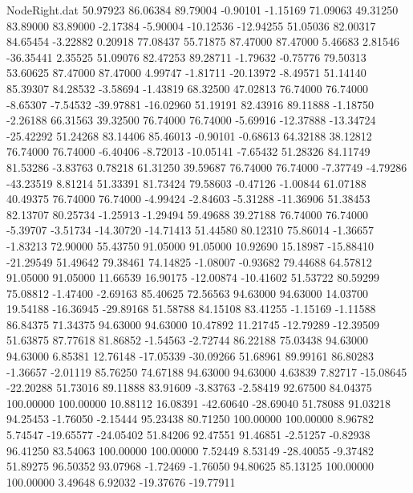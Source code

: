 \begin{filecontents}{NodeRight.dat}
  50.97923   86.06384   89.79004    -0.90101   -1.15169   71.09063   49.31250   83.89000   83.89000   -2.17384   -5.90004  -10.12536  -12.94255
  51.05036   82.00317   84.65454    -3.22882    0.20918   77.08437   55.71875   87.47000   87.47000    5.46683    2.81546  -36.35441    2.35525
  51.09076   82.47253   89.28711    -1.79632   -0.75776   79.50313   53.60625   87.47000   87.47000    4.99747   -1.81711  -20.13972   -8.49571
  51.14140   85.39307   84.28532    -3.58694   -1.43819   68.32500   47.02813   76.74000   76.74000   -8.65307   -7.54532  -39.97881  -16.02960
  51.19191   82.43916   89.11888    -1.18750   -2.26188   66.31563   39.32500   76.74000   76.74000   -5.69916  -12.37888  -13.34724  -25.42292
  51.24268   83.14406   85.46013    -0.90101   -0.68613   64.32188   38.12812   76.74000   76.74000   -6.40406   -8.72013  -10.05141   -7.65432
  51.28326   84.11749   81.53286    -3.83763    0.78218   61.31250   39.59687   76.74000   76.74000   -7.37749   -4.79286  -43.23519    8.81214
  51.33391   81.73424   79.58603    -0.47126   -1.00844   61.07188   40.49375   76.74000   76.74000   -4.99424   -2.84603   -5.31288  -11.36906
  51.38453   82.13707   80.25734    -1.25913   -1.29494   59.49688   39.27188   76.74000   76.74000   -5.39707   -3.51734  -14.30720  -14.71413
  51.44580   80.12310   75.86014    -1.36657   -1.83213   72.90000   55.43750   91.05000   91.05000   10.92690   15.18987  -15.88410  -21.29549
  51.49642   79.38461   74.14825    -1.08007   -0.93682   79.44688   64.57812   91.05000   91.05000   11.66539   16.90175  -12.00874  -10.41602
  51.53722   80.59299   75.08812    -1.47400   -2.69163   85.40625   72.56563   94.63000   94.63000   14.03700   19.54188  -16.36945  -29.89168
  51.58788   84.15108   83.41255    -1.15169   -1.11588   86.84375   71.34375   94.63000   94.63000   10.47892   11.21745  -12.79289  -12.39509
  51.63875   87.77618   81.86852    -1.54563   -2.72744   86.22188   75.03438   94.63000   94.63000    6.85381   12.76148  -17.05339  -30.09266
  51.68961   89.99161   86.80283    -1.36657   -2.01119   85.76250   74.67188   94.63000   94.63000    4.63839    7.82717  -15.08645  -22.20288
  51.73016   89.11888   83.91609    -3.83763   -2.58419   92.67500   84.04375  100.00000  100.00000   10.88112   16.08391  -42.60640  -28.69040
  51.78088   91.03218   94.25453    -1.76050   -2.15444   95.23438   80.71250  100.00000  100.00000    8.96782    5.74547  -19.65577  -24.05402
  51.84206   92.47551   91.46851    -2.51257   -0.82938   96.41250   83.54063  100.00000  100.00000    7.52449    8.53149  -28.40055   -9.37482
  51.89275   96.50352   93.07968    -1.72469   -1.76050   94.80625   85.13125  100.00000  100.00000    3.49648    6.92032  -19.37676  -19.77911

\end{filecontents}
